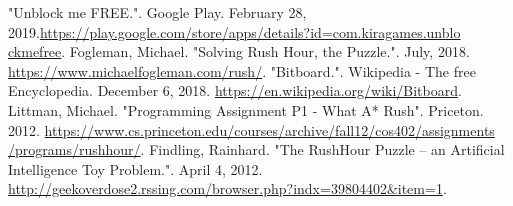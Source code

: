 \documentclass[conference]{IEEEtran}
\begin{document}
\begin{thebibliography}{00}
    
 "Unblock me FREE.". Google Play. February 28, 2019.\href{https://play.google.com/store/apps/details?id=com.kiragames.unblockmefree}{https://play.google.com/store/apps/details?id=com.kiragames.unblo\\ckmefree}.
 Fogleman, Michael. "Solving Rush Hour, the Puzzle.". July, 2018. \href{https://www.michaelfogleman.com/rush/}{https://www.michaelfogleman.com/rush/}.
 "Bitboard.". Wikipedia - The free Encyclopedia. December 6, 2018. \href{https://en.wikipedia.org/wiki/Bitboard}{https://en.wikipedia.org/wiki/Bitboard}.
 Littman, Michael. "Programming Assignment P1 - What A* Rush". Priceton. 2012. \href{https://www.cs.princeton.edu/courses/archive/fall12/cos402/assignments/programs/rushhour/}{https://www.cs.princeton.edu/courses/archive/fall12/cos402/assignments\\/programs/rushhour/}.
 Findling, Rainhard. "The RushHour Puzzle – an Artificial Intelligence Toy Problem.". April 4, 2012. \href{http://geekoverdose2.rssing.com/browser.php?indx=39804402\&item=1}{http://geekoverdose2.rssing.com/browser.php?indx=39804402\&item=1}.

\end{thebibliography}
\end{document}
